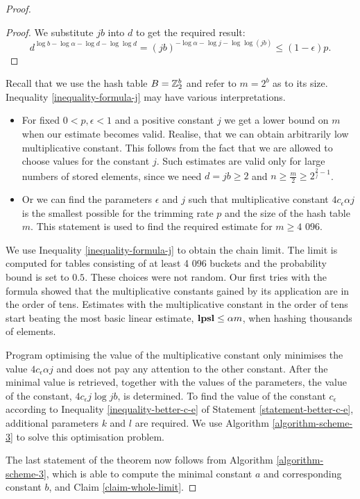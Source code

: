 \begin{proof}
\begin{proof}
We substitute $j b$ into $d$ to get the required result:
\[
	d ^ {\log b - \log \alpha - \log d - \log \log d} = \left(j b\right)^{-\log \alpha -\log j - \log \log (j b)} \leq (1 - \epsilon)p \text{.}
\]
\end{proof}

Recall that we use the hash table $B = \mathbb{Z}_{2}^{b}$ and refer to $m = 2 ^ b$ as to its size. Inequality \ref{inequality-formula-j} may have various interpretations.
\begin{itemize}
\item For fixed $0 < p, \epsilon < 1$ and a positive constant $j$ we get a lower bound on $m$ when our estimate becomes valid. Realise, that we can obtain arbitrarily low multiplicative constant. This follows from the fact that we are allowed to choose values for the constant $j$. Such estimates are valid only for large numbers of stored elements, since we need $d = jb \geq 2$ and $n \geq \frac{m}{2} \geq 2 ^ {\frac{2}{j} - 1}$.
\item Or we can find the parameters $\epsilon$ and $j$ such that multiplicative constant $4 c_\epsilon \alpha j$ is the smallest possible for the trimming rate $p$ and the size of the hash table $m$. This statement is used to find the required estimate for $m \geq \text{4 096}$.
\end{itemize}

We use Inequality \ref{inequality-formula-j} to obtain the chain limit. The limit is computed for tables consisting of at least 4 096 buckets and the probability bound is set to $0.5$. These choices were not random. Our first tries with the formula showed that the multiplicative constants gained by its application are in the order of tens. Estimates with the multiplicative constant in the order of tens start beating the most basic linear estimate, $\mathbf{lpsl} \leq \alpha m$, when hashing thousands of elements.

Program optimising the value of the multiplicative constant only minimises the value $4 c_\epsilon \alpha j$ and does not pay any attention to the other constant. After the minimal value is retrieved, together with the values of the parameters, the value of the constant, $4 c_\epsilon j \log j b$, is determined. To find the value of the constant $c_\epsilon$ according to Inequality \ref{inequality-better-c-e} of Statement \ref{statement-better-c-e}, additional parameters $k$ and $l$ are required. We use Algorithm \ref{algorithm-scheme-3} to solve this optimisation problem.

The last statement of the theorem now follows from Algorithm \ref{algorithm-scheme-3}, which is able to compute the minimal constant $a$ and corresponding constant $b$, and Claim \ref{claim-whole-limit}.


\end{proof}
